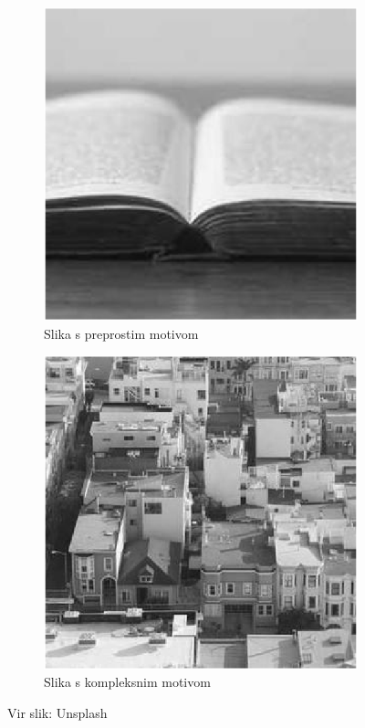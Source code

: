 \begin{figure}
    \begin{subfigure}{0.5\linewidth}
        \includegraphics[width=\linewidth]{Poglavja/Slike/preprosta grayscale 300/knjiga.png}
        \caption{Slika s preprostim motivom}
    \end{subfigure}
    \hfill
    \begin{subfigure}{0.5\linewidth}
        \includegraphics[width=\linewidth]{Poglavja/Slike/kompleksna grayscale 300/mesto.png}
        \caption{Slika s kompleksnim motivom}
    \end{subfigure}
    \caption{Vir slik: Unsplash}
\end{figure}


